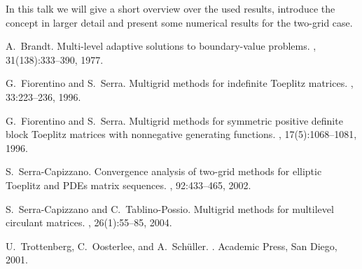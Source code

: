 \documentclass{report}
\begin{document}
In this talk we will give a short overview over the used results,
introduce the concept in larger detail and present some numerical results
for the two-grid case.

\begin{thebibliography}{1}

A.~Brandt.
\newblock Multi-level adaptive solutions to boundary-value problems.
, 31(138):333--390, 1977.

G.~Fiorentino and S.~Serra.
\newblock Multigrid methods for indefinite {Toeplitz} matrices.
, 33:223--236, 1996.

G.~Fiorentino and S.~Serra.
\newblock Multigrid methods for symmetric positive definite block {Toeplitz}
matrices with nonnegative generating functions.
, 17(5):1068--1081, 1996.

S.~Serra-Capizzano.
\newblock Convergence analysis of two-grid methods for elliptic Toeplitz and
PDEs matrix sequences.
, 92:433--465, 2002.

S.~Serra-Capizzano and C.~Tablino-Possio.
\newblock Multigrid methods for multilevel circulant matrices.
, 26(1):55--85, 2004.

U.~Trottenberg, C.~Oosterlee, and A.~Sch{\"u}ller.
.
\newblock Academic Press, San Diego, 2001.

\end{thebibliography}
\end{document}
